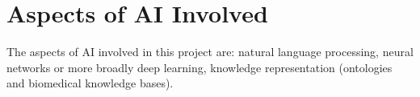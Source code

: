 \documentclass[11pt]{article}
\begin{document}
\section{Aspects of AI Involved}
The aspects of AI involved in this project are: natural language processing, neural networks or more broadly deep learning, knowledge representation (ontologies and biomedical knowledge bases). 

\newpage



\nocite{pilehvar-collier-2016-improved, choi-etal-2014-analysis, Prokofyev:2015:SOC:2942298.2942337, 95e005df001d47be8468f24479845109,clark-manning-2016-improving}
\end{document}
